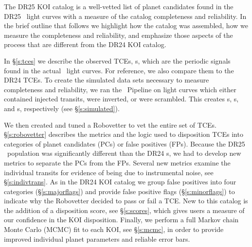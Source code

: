 The DR25 KOI catalog is a well-vetted list of planet candidates found in the DR25 \Kepler\ light curves with a measure of the catalog completeness and reliability. In the brief outline that follows we highlight how the catalog was assembled, how we measure the completeness and reliability, and emphasize those aspects of the process that are different from the DR24 KOI catalog.


In \S\ref{s:tces} we describe the observed TCEs, \opstce s, which are the periodic signals found in the actual \Kepler\ light curves. For reference, we also compare them to the DR24 TCEs. To create the simulated data sets necessary to measure completeness and reliability, we ran the \Kepler\ Pipeline on light curves which either contained injected transits, were inverted, or were scrambled. This creates \injtce s, \invtce s, and \scrtce s, respectively (see \S\ref{s:simulated}).  

We then created and tuned a Robovetter to vet the entire set of TCEs. \S\ref{s:robovetter} describes the metrics and the logic used to disposition TCEs into categories of planet candidates (PCs) or false positives (FPs). Because the DR25 \opstce\ population was significantly different than the DR24 \opstce s, we had to develop new metrics to separate the PCs from the FPs. Several new metrics examine the individual transits for evidence of being due to instrumental noise, see \S\ref{s:indivtrans}. As in the DR24 KOI catalog we group false positives into four categories (\S\ref{s:majorflags}) and provide false positive flags (\S\ref{s:minorflags}) to indicate why the Robovetter decided to pass or fail a TCE.  New to this catalog is the addition of a disposition score, see \S\ref{s:scores}, which gives users a measure of our confidence in the KOI disposition. Finally, we perform a full Markov chain Monte Carlo (MCMC) fit to each KOI, see \S\ref{s:mcmc}, in order to provide improved individual planet parameters and reliable error bars.


